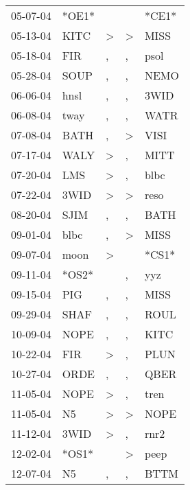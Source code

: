 \begin{supertabular}{lllll}
 05-07-04 &  *OE1* &                  &                  &  *CE1* \\
 05-13-04 &   KITC &     \textgreater &     \textgreater &   MISS \\
 05-18-04 &    FIR &                , &                , &   psol \\
 05-28-04 &   SOUP &                , &                , &   NEMO \\
 06-06-04 &   hnsl &                , &                , &   3WID \\
 06-08-04 &   tway &                , &                , &   WATR \\
 07-08-04 &   BATH &                , &     \textgreater &   VISI \\
 07-17-04 &   WALY &     \textgreater &                , &   MITT \\
 07-20-04 &    LMS &     \textgreater &                , &   blbc \\
 07-22-04 &   3WID &     \textgreater &     \textgreater &   reso \\
 08-20-04 &   SJIM &                , &                , &   BATH \\
 09-01-04 &   blbc &                , &     \textgreater &   MISS \\
 09-07-04 &   moon &     \textgreater &                  &  *CS1* \\
 09-11-04 &  *OS2* &                  &                , &    yyz \\
 09-15-04 &    PIG &                , &                , &   MISS \\
 09-29-04 &   SHAF &                , &                , &   ROUL \\
 10-09-04 &   NOPE &                , &                , &   KITC \\
 10-22-04 &    FIR &     \textgreater &                , &   PLUN \\
 10-27-04 &   ORDE &                , &                , &   QBER \\
 11-05-04 &   NOPE &     \textgreater &                , &   tren \\
 11-05-04 &     N5 &     \textgreater &     \textgreater &   NOPE \\
 11-12-04 &   3WID &     \textgreater &                , &   rnr2 \\
 12-02-04 &  *OS1* &                  &     \textgreater &   peep \\
 12-07-04 &     N5 &                , &                , &   BTTM \\

\end{supertabular}
